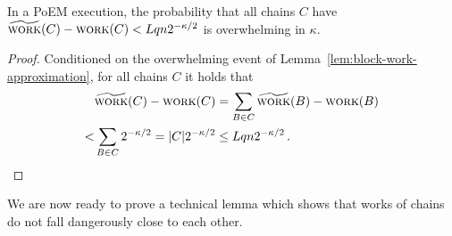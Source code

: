 \begin{corollary}\label{cor:chain-work-approximation}
  In a PoEM execution, the probability that all chains $C$
  have $\widetilde{\textsc{work}}(C) - \textsc{work}(C) < Lqn 2^{-\kappa/2}$
  is overwhelming in $\kappa$.
\end{corollary}
\begin{proof}
  Conditioned on the overwhelming event of Lemma~\ref{lem:block-work-approximation}, for all
  chains $C$ it holds that
  \begin{align*}
     &\widetilde{\textsc{work}}(C) - \textsc{work}(C) = \sum_{B \in C}{\widetilde{\textsc{work}}(B) - \textsc{work}(B)}\\
    <& \sum_{B \in C}{2^{-\kappa/2}} = |C| 2^{-\kappa/2} \leq Lqn 2^{-\kappa/2}\,.
  \end{align*}
  \Qed
\end{proof}

We are now ready to prove a technical lemma which shows that works
of chains do not fall dangerously close to each other.

